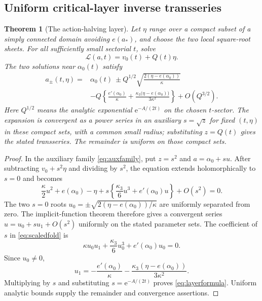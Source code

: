 \documentclass[11pt,a4paper]{article}
\numberwithin{equation}{section}
\newtheorem{theorem}{Theorem}[section]
\theoremstyle{definition}
\theoremstyle{remark}
\newcommand{\e}{\mathrm e}
\newcommand{\cL}{\mathcal L}
\begin{document}
\subsection{Uniform critical-layer inverse transseries}
\begin{theorem}[The action-halving layer]
\label{thm:layer}
Let $\eta$ range over a compact subset of a simply connected domain
avoiding $e(a_*)$, and choose the two local square-root sheets.
For all sufficiently small sectorial $t$, solve
\begin{equation}
 \cL(a,t)=v_0(t)+Q(t)\eta.
 \label{eq:layerlevel}
\end{equation}
The two solutions near $\alpha_0(t)$ satisfy
\begin{align}
 a_\pm(t,\eta)
 ={}&\alpha_0(t)
 \ \pm Q^{1/2}\sqrt{\frac{2(\eta-e(\alpha_0))}{\kappa}}\nonumber\\
 &-Q\left\{\frac{e'(\alpha_0)}{\kappa}
       +\frac{\kappa_3\big(\eta-e(\alpha_0)\big)}{3\kappa^2}\right\}
 +O(Q^{3/2}).
 \label{eq:layerformula}
\end{align}
Here $Q^{1/2}$ means the analytic exponential $\e^{-A/(2t)}$ on the
chosen $t$-sector. The expansion is convergent as a power series in
an auxiliary $s=\sqrt z$ for fixed $(t,\eta)$ in these compact sets,
with a common small radius; substituting $z=Q(t)$ gives the stated
transseries. The remainder is uniform on those compact sets.
\end{theorem}
\begin{proof}
In the auxiliary family \eqref{eq:auxfamily}, put $z=s^2$ and
$a=\alpha_0+su$. After subtracting $v_0+s^2\eta$ and dividing by
$s^2$, the equation extends holomorphically to $s=0$ and becomes
\begin{equation}
 \frac\kappa2u^2+e(\alpha_0)-\eta
 +s\left\{\frac{\kappa_3}{6}u^3+e'(\alpha_0)u\right\}
 +O(s^2)=0.
 \label{eq:scaledfold}
\end{equation}
The two $s=0$ roots
$u_0=\pm\sqrt{2(\eta-e(\alpha_0))/\kappa}$ are uniformly separated
from zero. The implicit-function theorem therefore gives a convergent
series $u=u_0+s u_1+O(s^2)$ uniformly on the stated parameter sets.
The coefficient of $s$ in \eqref{eq:scaledfold} is
\[
 \kappa u_0u_1+\frac{\kappa_3}{6}u_0^3+e'(\alpha_0)u_0=0.
\]
Since $u_0\ne0$,
\[
 u_1=-\frac{e'(\alpha_0)}\kappa
      -\frac{\kappa_3(\eta-e(\alpha_0))}{3\kappa^2}.
\]
Multiplying by $s$ and substituting $s=\e^{-A/(2t)}$ proves
\eqref{eq:layerformula}. Uniform analytic bounds supply the remainder
and convergence assertions.
\end{proof}
\end{document}
